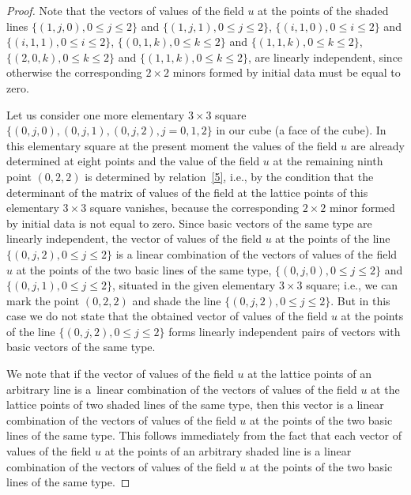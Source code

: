 \documentclass[11pt]{article}
\begin{document}
\begin{proof}
Note that the vectors of values of the f\/ield $u$ at the points of
the shaded lines $\{(1, j, 0), 0 \leq j \leq 2\}$ and $\{(1, j, 1),
0 \leq j \leq 2\}$, $\{(i, 1, 0), 0 \leq i \leq 2\}$ and $\{(i, 1,
1), 0 \leq i \leq 2\}$, $\{(0, 1, k), 0 \leq k \leq 2\}$ and $\{(1,
1, k), 0 \leq k \leq 2\}$, $\{(2, 0, k), 0 \leq k \leq 2\}$ and
$\{(1, 1, k), 0 \leq k \leq 2\}$, are linearly independent, since
otherwise the corresponding $2 \times 2$ minors formed by initial
data must be equal to zero.



Let us consider one more elementary $3 \times 3$ square $\{(0, j,
0), (0, j, 1), (0, j, 2), j = 0, 1, 2\}$ in our cube (a face of the
cube). In this elementary square at the present moment the values of
the f\/ield $u$ are already determined at eight points and the value
of the f\/ield $u$ at the remaining ninth point $(0, 2, 2)$ is
determined by relation~\eqref{5}, i.e., by the condition that
the determinant of the matrix of values of the f\/ield at the lattice
points of this elementary $3 \times 3$ square vanishes, because the
corresponding $2 \times 2$ minor formed by initial data is not equal
to zero. Since basic vectors of the same type are linearly
independent, the vector of values of the f\/ield $u$ at the points of
the line $\{(0, j, 2), 0 \leq j \leq 2\}$ is a linear combination of
the vectors of values of the f\/ield $u$ at the points of the two
basic lines of the same type, $\{(0, j, 0), 0 \leq j \leq 2\}$ and
$\{(0, j, 1), 0 \leq j \leq 2\}$, situated in the given elementary
$3 \times 3$ square; i.e., we can mark the point $(0, 2, 2)$ and
shade the line $\{(0, j, 2), 0 \leq j \leq 2\}$. But in this case we
do not state that the obtained vector of values of the f\/ield $u$ at
the points of the line $\{(0, j, 2), 0 \leq j \leq 2\}$ forms
linearly independent pairs of vectors with basic vectors of the same
type.



We note that if the vector of values of the f\/ield $u$ at the lattice
points of an arbitrary line is a~linear combination of the vectors
of values of the f\/ield $u$ at the lattice points of two shaded lines
of the same type, then this vector is a linear combination of the
vectors of values of the f\/ield $u$ at the points of the two basic
lines of the same type. This follows immediately from the fact that
each vector of values of the f\/ield $u$ at the points of an arbitrary
shaded line is a linear combination of the vectors of values of the
f\/ield $u$ at the points of the two basic lines of the same type.


\end{proof}
\end{document}
